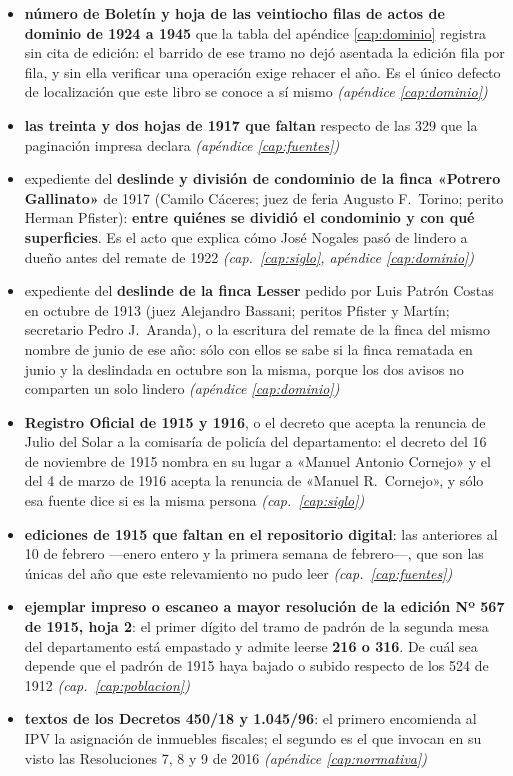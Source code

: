 \begin{itemize}[leftmargin=*]
\item \textbf{número de Boletín y hoja de las veintiocho filas de actos de dominio de 1924 a 1945} que la tabla del apéndice \ref{cap:dominio} registra sin cita de edición: el barrido de ese tramo no dejó asentada la edición fila por fila, y sin ella verificar una operación exige rehacer el año. Es el único defecto de localización que este libro se conoce a sí mismo \textit{(apéndice \ref{cap:dominio})}
\item \textbf{las treinta y dos hojas de 1917 que faltan} respecto de las 329 que la paginación impresa declara \textit{(apéndice \ref{cap:fuentes})}
\item expediente del \textbf{deslinde y división de condominio de la finca «Potrero Gallinato»} de 1917 (Camilo Cáceres; juez de feria Augusto F.\ Torino; perito Herman Pfister): \textbf{entre quiénes se dividió el condominio y con qué superficies}. Es el acto que explica cómo José Nogales pasó de lindero a dueño antes del remate de 1922 \textit{(cap.\ \ref{cap:siglo}, apéndice \ref{cap:dominio})}
\item expediente del \textbf{deslinde de la finca Lesser} pedido por Luis Patrón Costas en octubre de 1913 (juez Alejandro Bassani; peritos Pfister y Martín; secretario Pedro J.\ Aranda), o la escritura del remate de la finca del mismo nombre de junio de ese año: sólo con ellos se sabe si la finca rematada en junio y la deslindada en octubre son la misma, porque los dos avisos no comparten un solo lindero \textit{(apéndice \ref{cap:dominio})}
\item \textbf{Registro Oficial de 1915 y 1916}, o el decreto que acepta la renuncia de Julio del Solar a la comisaría de policía del departamento: el decreto del 16 de noviembre de 1915 nombra en su lugar a «Manuel Antonio Cornejo» y el del 4 de marzo de 1916 acepta la renuncia de «Manuel R.\ Cornejo», y sólo esa fuente dice si es la misma persona \textit{(cap.\ \ref{cap:siglo})}
\item \textbf{ediciones de 1915 que faltan en el repositorio digital}: las anteriores al 10 de febrero ---enero entero y la primera semana de febrero---, que son las únicas del año que este relevamiento no pudo leer \textit{(cap.\ \ref{cap:fuentes})}
\item \textbf{ejemplar impreso o escaneo a mayor resolución de la edición Nº 567 de 1915, hoja 2}: el primer dígito del tramo de padrón de la segunda mesa del departamento está empastado y admite leerse \textbf{216 o 316}. De cuál sea depende que el padrón de 1915 haya bajado o subido respecto de los 524 de 1912 \textit{(cap.\ \ref{cap:poblacion})}
\item \textbf{textos de los Decretos 450/18 y 1.045/96}: el primero encomienda al IPV la asignación de inmuebles fiscales; el segundo es el que invocan en su visto las Resoluciones 7, 8 y 9 de 2016 \textit{(apéndice \ref{cap:normativa})}
\end{itemize}

